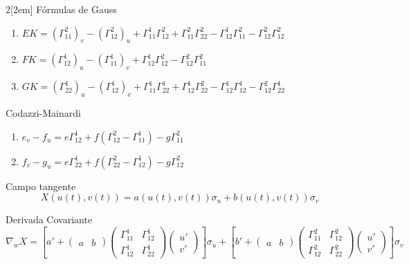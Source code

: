 \documentclass{myclass}
\begin{document}
\begin{multicols}{2}[\columnsep2em]
Fórmulas de Gauss
\begin{enumerate}[topsep=-6pt, itemsep=0pt]
    \item $EK = (\Gamma_{11}^2)_v - (\Gamma_{12}^2)_u + \Gamma_{11}^1\Gamma_{12}^2 + \Gamma_{11}^2\Gamma_{22}^2 - \Gamma_{12}^1\Gamma_{11}^2 - \Gamma_{12}^2\Gamma_{12}^2$
    \item $FK = (\Gamma_{12}^1)_u - (\Gamma_{11}^1)_v + \Gamma_{12}^1\Gamma_{12}^2 - \Gamma_{12}^2\Gamma_{11}^2$
    \item $GK = (\Gamma_{22}^1)_u - (\Gamma_{12}^1)_v + \Gamma_{11}^1\Gamma_{22}^1 + \Gamma_{12}^1\Gamma_{22}^2 - \Gamma_{12}^1\Gamma_{12}^1 - \Gamma_{12}^2\Gamma_{22}^1$
  \end{enumerate}

  Codazzi-Mainardi
  \begin{enumerate}[topsep=-6pt, itemsep=0pt]
    \item $e_v-f_u = e\Gamma_{12}^1 + f(\Gamma_{12}^2 - \Gamma _{11}^1) - g\Gamma_{11}^2$
	\item $f_v-g_u = e\Gamma_{22}^1 + f(\Gamma_{22}^2-\Gamma_{12}^1)-g\Gamma_{12}^2$
  \end{enumerate}


\end{multicols}
\newpage

Campo tangente
\[
X(u(t), v(t)) = a(u(t), v(t))\sigma _u + b(u(t), v(t))\sigma _v
\]

Derivada Covariante
\[
  \nabla _wX = \left[ a' + \begin{pmatrix} a & b \end{pmatrix} \begin{pmatrix} \Gamma_{11}^1 & \Gamma _{12}^1 \\ \Gamma _{12}^1 & \Gamma_{22}^1 \end{pmatrix} \begin{pmatrix} u' \\ v' \end{pmatrix}   \right] \sigma _u + \left[ b' + \begin{pmatrix} a & b \end{pmatrix} \begin{pmatrix} \Gamma _{11}^2 & \Gamma _{12}^2 \\ \Gamma _{12}^2 & \Gamma _{22}^2 \end{pmatrix} \begin{pmatrix} u' \\ v' \end{pmatrix}   \right] \sigma _v
\]
\end{document}
